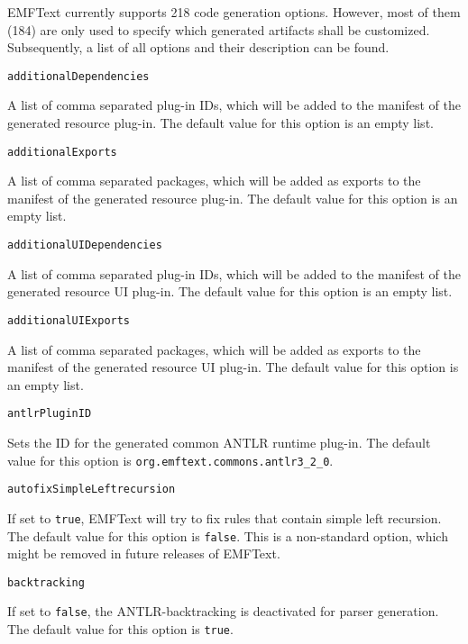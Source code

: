 EMFText currently supports 218 code generation options. However, most of them (184) are only used to specify which generated artifacts shall be customized. Subsequently, a list of all options and their description can be found.

\vspace{1cm}\noindent\texttt{additionalDependencies}
\begin{myindentpar}{1cm}
A list of comma separated plug-in IDs, which will be added to the manifest of the generated resource plug-in. The default value for this option is an empty list.
\end{myindentpar}

\noindent\texttt{additionalExports}
\begin{myindentpar}{1cm}
A list of comma separated packages, which will be added as exports to the manifest of the generated resource plug-in. The default value for this option is an empty list.
\end{myindentpar}

\noindent\texttt{additionalUIDependencies}
\begin{myindentpar}{1cm}
A list of comma separated plug-in IDs, which will be added to the manifest of the generated resource UI plug-in. The default value for this option is an empty list.
\end{myindentpar}

\noindent\texttt{additionalUIExports}
\begin{myindentpar}{1cm}
A list of comma separated packages, which will be added as exports to the manifest of the generated resource UI plug-in. The default value for this option is an empty list.
\end{myindentpar}

\noindent\texttt{antlrPluginID}
\begin{myindentpar}{1cm}
Sets the ID for the generated common ANTLR runtime plug-in. The default value for this option is \texttt{org.emftext.commons.antlr3\_2\_0}.
\end{myindentpar}

\noindent\texttt{autofixSimpleLeftrecursion}
\begin{myindentpar}{1cm}
If set to \texttt{true}, EMFText will try to fix rules that contain simple left recursion. The default value for this option is \texttt{false}. This is a non-standard option, which might be removed in future releases of EMFText.
\end{myindentpar}

\noindent\texttt{backtracking}
\begin{myindentpar}{1cm}
If set to \texttt{false}, the ANTLR-backtracking is deactivated for parser generation. The default value for this option is \texttt{true}.
\end{myindentpar}

